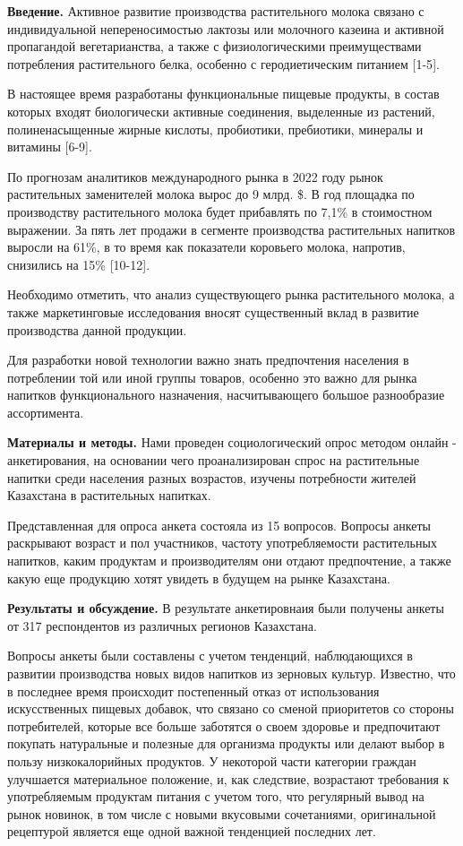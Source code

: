 \begin{multicols}{2}
{\bfseries Введение.} Активное развитие производства растительного молока
связано с индивидуальной непереносимостью лактозы или молочного казеина
и активной пропагандой вегетарианства, а также с физиологическими
преимуществами потребления растительного белка, особенно с
геродиетическим питанием {[}1-5{]}.

В настоящее время разработаны функциональные пищевые продукты, в состав
которых входят биологически активные соединения, выделенные из растений,
полиненасыщенные жирные кислоты, пробиотики, пребиотики, минералы и
витамины {[}6-9{]}.

По прогнозам аналитиков международного рынка в 2022 году рынок
растительных заменителей молока вырос до 9 млрд. \$. В год площадка по
производству растительного молока будет прибавлять по 7,1\% в
стоимостном выражении. За пять лет продажи в сегменте производства
растительных напитков выросли на 61\%, в то время как показатели
коровьего молока, напротив, снизились на 15\% {[}10-12{]}.

Необходимо отметить, что анализ существующего рынка растительного
молока, а также маркетинговые исследования вносят существенный вклад в
развитие производства данной продукции.

Для разработки новой технологии важно знать предпочтения населения в
потреблении той или иной группы товаров, особенно это важно для рынка
напитков функционального назначения, насчитывающего большое разнообразие
ассортимента.

{\bfseries Материалы и методы.} Нами проведен социологический опрос методом
онлайн - анкетирования, на основании чего проанализирован спрос на
растительные напитки среди населения разных возрастов, изучены
потребности жителей Казахстана в растительных напитках.

Представленная для опроса анкета состояла из 15 вопросов. Вопросы анкеты
раскрывают возраст и пол участников, частоту употребляемости
растительных напитков, каким продуктам и производителям они отдают
предпочтение, а также какую еще продукцию хотят увидеть в будущем на
рынке Казахстана.

{\bfseries Результаты и обсуждение.} В результате анкетировнаия были
получены анкеты от 317 респондентов из различных регионов Казахстана.

Вопросы анкеты были составлены с учетом тенденций, наблюдающихся в
развитии производства новых видов напитков из зерновых культур.
Известно, что в последнее время происходит постепенный отказ от
использования искусственных пищевых добавок, что связано со сменой
приоритетов со стороны потребителей, которые все больше заботятся о
своем здоровье и предпочитают покупать натуральные и полезные для
организма продукты или делают выбор в пользу низкокалорийных продуктов.
У некоторой части категории граждан улучшается материальное положение,
и, как следствие, возрастают требования к употребляемым продуктам
питания с учетом того, что регулярный вывод на рынок новинок, в том
числе с новыми вкусовыми сочетаниями, оригинальной рецептурой является
еще одной важной тенденцией последних лет.


\end{multicols}
